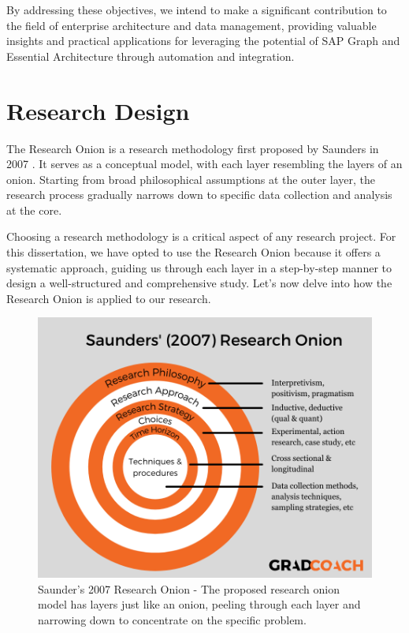 \documentclass{article}
\begin{document}
By addressing these objectives, we intend to make a significant contribution to the field of enterprise architecture and data management, providing valuable insights and practical applications for leveraging the potential of SAP Graph and Essential Architecture through automation and integration.

\maketitle
\section{Research Design}
The Research Onion is a research methodology first proposed by Saunders in 2007 \parencite{sahay2016}. It serves as a conceptual model, with each layer resembling the layers of an onion. Starting from broad philosophical assumptions at the outer layer, the research process gradually narrows down to specific data collection and analysis at the core.

Choosing a research methodology is a critical aspect of any research project. For this dissertation, we have opted to use the Research Onion because it offers a systematic approach, guiding us through each layer in a step-by-step manner to design a well-structured and comprehensive study. Let's now delve into how the Research Onion is applied to our research.

\begin{figure}[ht!]
    \centering
    \includegraphics[scale=0.4]{onion-research}
    \caption{Saunder's 2007 Research Onion - The proposed research onion model has layers just like an onion, peeling through each layer and narrowing down to concentrate on the specific problem. \parencite{gradcoach}}
    \label{fig: onion research}
\end{figure}
\end{document}
